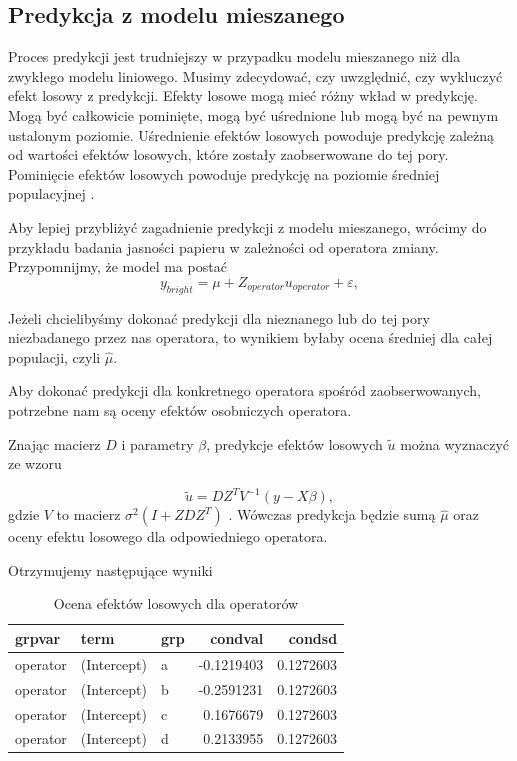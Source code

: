 \documentclass[12pt]{mwbk}
\theoremstyle{plain}
\theoremstyle{definition}
\theoremstyle{remark}
\newcommand\zrodlo[1]{\par\vspace{-3mm}{\small\textit{Źródło: }#1 }}
\begin{document}
\subsection{Predykcja z modelu mieszanego}
Proces predykcji jest trudniejszy w przypadku modelu mieszanego niż dla zwykłego modelu liniowego. Musimy zdecydować, czy uwzględnić, czy wykluczyć efekt losowy z predykcji. Efekty losowe mogą mieć różny wkład w predykcję. Mogą być całkowicie pominięte, mogą być uśrednione lub mogą być na pewnym ustalonym poziomie. Uśrednienie efektów losowych powoduje predykcję zależną od wartości efektów losowych, które zostały zaobserwowane do tej pory. Pominięcie efektów losowych powoduje predykcję na poziomie średniej populacyjnej
 \cite{prediction}.
 
 Aby lepiej przybliżyć zagadnienie predykcji z modelu mieszanego, wrócimy do przykładu badania jasności papieru w zależności od operatora zmiany. Przypomnijmy, że model ma postać
  $$y_{bright}=\mu+Z_{operator}u_{operator}+\varepsilon,$$
 
  Jeżeli chcielibyśmy dokonać predykcji dla nieznanego lub do tej pory niezbadanego przez nas operatora, to wynikiem byłaby ocena średniej dla całej populacji, czyli $\hat{\mu}$.
 
  Aby dokonać predykcji dla konkretnego operatora spośród zaobserwowanych, potrzebne nam są oceny efektów osobniczych operatora.
 
 Znając macierz $D$ i parametry $\beta$, predykcje efektów losowych $\widetilde{u}$ można wyznaczyć ze wzoru
 
 $$\widetilde{u}=DZ^TV^{-1}(y-X\beta),$$
 gdzie $V$ to macierz $\sigma^2(I+ZDZ^T)$ \cite{biecek}. Wówczas predykcja będzie sumą $\hat{\mu}$ oraz oceny efektu losowego dla odpowiedniego operatora.
 
Otrzymujemy następujące wyniki

\begin{table}[htbp]
	\centering

\begin{tabular}{l|l|l|r|r}
	\hline
	grpvar & term & grp & condval & condsd\\
	\hline
	operator & (Intercept) & a & -0.1219403 & 0.1272603\\
	\hline
	operator & (Intercept) & b & -0.2591231 & 0.1272603\\
	\hline
	operator & (Intercept) & c & 0.1676679 & 0.1272603\\
	\hline
	operator & (Intercept) & d & 0.2133955 & 0.1272603\\
	\hline
\end{tabular}
 \caption{Ocena efektów losowych dla operatorów}
 \label{tab:ranef_pulp}
 \zrodlo{Opracowanie własne}
\end{table}
 
\end{document}
